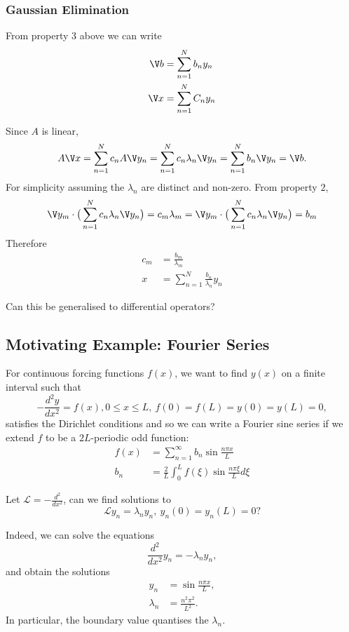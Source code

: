 \documentclass[a4paper]{article}
\renewcommand*{\L}{\mathcal{L}}
\begin{document}
\subsubsection{Gaussian Elimination}

From property \(3\) above we can write
\begin{align*}
  \V b &= \sum_{n=1}^{N}b_n y_n \\
  \V x &=\sum_{n=1}^{N}C_n y_n
\end{align*}

Since \(A\) is linear,
\[
  A \V x = \sum_{n=1}^{N}c_n A \V y_n = \sum_{n=1}^{N}c_n \lambda_n \V y_n = \sum_{n=1}^{N}b_n \V y_n = \V b.
\]
For simplicity assuming the \(\lambda_n\) are distinct and non-zero. From property \(2\),
\[
\V y_m \cdot \big( \sum_{n=1}^{N}c_n \lambda_n \V y_n \big) = c_m \lambda_m = \V y_m \cdot \big( \sum_{n=1}^{N}c_n \lambda_n \V y_n \big) = b_m
\]
Therefore
\begin{align*}
  c_m &= \frac{b_m}{\lambda_m} \\
  x &= \sum_{n=1}^{N}\frac{b_n}{\lambda_n}y_n
\end{align*}

\begin{question}
  Can this be generalised to differential operators?
\end{question}

\subsection{Motivating Example: Fourier Series}
\label{subsec:motivating}

For continuous forcing functions \(f(x)\), we want to find \(y(x)\) on a finite interval such that
\[
  -\frac{d^2y}{dx^2} = f(x), 0 \leq x \leq L, \: f(0) = f(L) = y(0) = y(L) = 0,
\]
satisfies the Dirichlet conditions and so we can write a Fourier sine series if we extend \(f\) to be a \(2L\)-periodic odd function:
\begin{align*}
  f(x) &= \sum_{n=1}^{\infty}b_n \sin \frac{n\pi x}{L} \\
  b_n &= \frac{2}{L} \int_{0}^{L} f(\xi) \sin \frac{n\pi \xi}{L} d\xi
\end{align*}

Let \(\L = - \frac{d^2}{dx^2}\), can we find solutions to
\[
\L y_n = \lambda_n y_n,\: y_n(0) = y_n(L) = 0?
\]

Indeed, we can solve the equations
\[
  \frac{d^2}{dx^2} y_n = - \lambda_n y_n,
\]
and obtain the solutions
\begin{align*}
  y_n &= \sin \frac{n\pi x}{L}, \\
  \lambda_n &= \frac{n^2\pi^2}{L^2}.
\end{align*}
In particular, the boundary value quantises the \(\lambda_n\).
\end{document}
